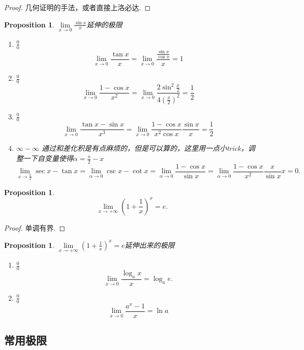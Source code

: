 \documentclass{article}
\newtheorem{proposition}[theorem]{Proposition}
\begin{document}
\begin{proof}
几何证明的手法，或者直接上洛必达.
\end{proof}

\begin{proposition}
\rm {\color{blue}$\lim\limits_{x \rightarrow 0} \frac{\sin x}{x}$延伸的极限}
\begin{enumerate}
	\item $\frac{0}{0}$
	$$
	\lim\limits_{x \rightarrow 0} \frac{\tan x}{x} = \lim\limits_{x \rightarrow 0} \frac{\frac{\sin x}{\cos x}}{x} = 1
	$$
	\item $\frac{0}{0}$
	$$
	\lim\limits_{x \rightarrow 0} \frac{1-\cos x}{x^2} = \lim\limits_{x \rightarrow 0} \frac{2\sin^2\frac{x}{2}}{4(\frac{x}{2})^2} = \frac{1}{2}
	$$
	\item $\frac{0}{0}$
	$$
	\lim\limits_{x \rightarrow 0} \frac{\tan x-\sin x}{x^3} = \lim\limits_{x \rightarrow 0} \frac{1-\cos x}{x^2\cos x}\frac{\sin x}{x} = \frac{1}{2}
	$$
	\item $\infty - \infty$ 通过和差化积是有点麻烦的，但是可以算的，这里用一点小trick，调整一下自变量使得$\alpha = \frac{\pi}{2} - x$
	$$
		\lim\limits_{x \rightarrow \frac{\pi}{2}} \sec x -\tan x = \lim\limits_{\alpha \rightarrow 0} \csc x - \cot x = \lim\limits_{\alpha \rightarrow 0} \frac{1-\cos x}{\sin x} = \lim\limits_{\alpha \rightarrow 0} \frac{1-\cos x}{x^2} \frac{x}{\sin x} x = 0.
	$$
\end{enumerate}
\end{proposition}

\begin{proposition}
$$
\lim\limits_{x \rightarrow +\infty} (1+\frac{1}{x})^x = e.
$$
\end{proposition}

\begin{proof}
单调有界.
\end{proof}

\begin{proposition}
\rm $\lim\limits_{x \rightarrow +\infty} (1+\frac{1}{x})^x = e$延伸出来的极限
\begin{enumerate}
	\item $\frac{0}{0}$
	$$
	\lim\limits_{x \rightarrow 0} \frac{\log_a x}{x} = \log_a e.
	$$
	\item $\frac{0}{0}$
	$$
	\lim\limits_{x \rightarrow 0} \frac{a^x - 1}{x} = \ln a
	$$
\end{enumerate}
\end{proposition}

\subsection{常用极限}
\end{document}
